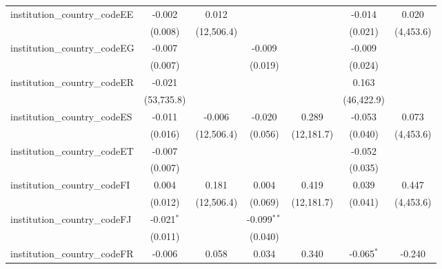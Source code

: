 \begin{tabular}{lcccccc}
   institution\_country\_codeEE          & -0.002         & 0.012         &               &               & -0.014        & 0.020\\   
                                         & (0.008)        & (12,506.4)    &               &               & (0.021)       & (4,453.6)\\   
   institution\_country\_codeEG          & -0.007         &               & -0.009        &               & -0.009        &   \\   
                                         & (0.007)        &               & (0.019)       &               & (0.024)       &   \\   
   institution\_country\_codeER          & -0.021         &               &               &               & 0.163         &   \\   
                                         & (53,735.8)     &               &               &               & (46,422.9)    &   \\   
   institution\_country\_codeES          & -0.011         & -0.006        & -0.020        & 0.289         & -0.053        & 0.073\\   
                                         & (0.016)        & (12,506.4)    & (0.056)       & (12,181.7)    & (0.040)       & (4,453.6)\\   
   institution\_country\_codeET          & -0.007         &               &               &               & -0.052        &   \\   
                                         & (0.007)        &               &               &               & (0.035)       &   \\   
   institution\_country\_codeFI          & 0.004          & 0.181         & 0.004         & 0.419         & 0.039         & 0.447\\   
                                         & (0.012)        & (12,506.4)    & (0.069)       & (12,181.7)    & (0.041)       & (4,453.6)\\   
   institution\_country\_codeFJ          & -0.021$^{*}$   &               & -0.099$^{**}$ &               &               &   \\   
                                         & (0.011)        &               & (0.040)       &               &               &   \\   
   institution\_country\_codeFR          & -0.006         & 0.058         & 0.034         & 0.340         & -0.065$^{*}$  & -0.240\\   

\end{tabular}
